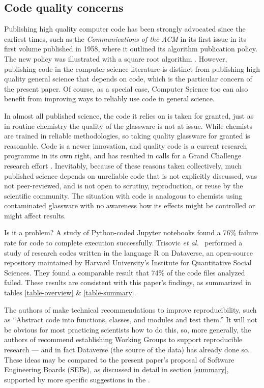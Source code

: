 \documentclass{comjnl}
\begin{document}
\subsection{Code quality concerns}\label{related-work}
Publishing high quality computer code has been strongly advocated since the earliest times, such as the \emph{Communications of the ACM\/} in its first issue in its first volume published in 1958, where it outlined its algorithm publication policy. The new policy was illustrated with a square root algorithm \cite{acm-algorithms}. However, publishing code in the computer science literature is distinct from publishing high quality general science that depends on code, which is the particular concern of the present paper. Of course, as a special case, Computer Science too can also benefit from improving ways to reliably use code in general science.

In almost all published science, the code it relies on is taken for granted, just as in routine chemistry the quality of the glassware is not at issue. While chemists are trained in reliable methodologies, so taking quality glassware for granted is reasonable. Code is a newer innovation, and quality code is a current research programme in its own right, and has resulted in calls for a Grand Challenge research effort \cite{hoare-correctness}. Inevitably, because of these reasons taken collectively, much published science depends on unreliable code that is not explicitly discussed, was not peer-reviewed, and is not open to scrutiny, reproduction, or reuse by the scientific community. The situation with code is analogous to chemists using contaminated glassware with no awareness how its effects might be controlled or might affect results.

Is it a problem? A study of  Python-coded Jupyter notebooks \cite{jupyter-study} found a 76\% failure rate for code to complete execution successfully. Trisovic \emph{et al.}\ \cite{trisovic} performed a  study of  research codes written in the language R on Dataverse, an open-source repository maintained by Harvard University's Institute for Quantitative Social Sciences. They found a comparable result that 74\% of the code files analyzed failed. These results are consistent with this paper's findings, as summarized in tables \ref{table-overview} \& \ref{table-summary}. 

The authors of \cite{jupyter-study} make technical recommendations to improve reproducibility, such as ``Abstract code into functions, classes, and modules and test them.'' It will not be obvious for most practicing scientists how to do this, so, more generally, the authors of \cite{trisovic} recommend establishing Working Groups to support reproducible research --- and in fact Dataverse (the source of the \cite{trisovic} data) has already done so. These ideas may be compared to the present paper's proposal of Software Engineering Boards (SEBs), as discussed in detail in section \ref{summary}, supported by more specific suggestions in the \supplement.
\end{document}
